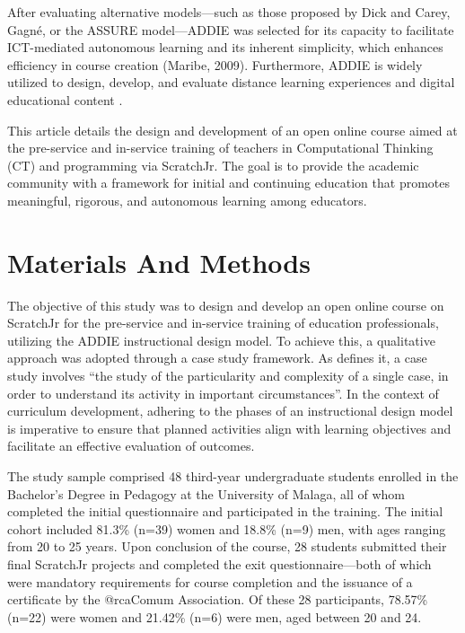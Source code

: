\documentclass[english]{textolivre}
\begin{document}
After evaluating alternative models—such as those proposed by Dick and Carey, Gagné, or the ASSURE model—ADDIE was selected for its capacity to facilitate ICT-mediated autonomous learning and its inherent simplicity, which enhances efficiency in course creation (Maribe, 2009). Furthermore, ADDIE is widely utilized to design, develop, and evaluate distance learning experiences and digital educational content \cite{trust2018using,raposo2020innovacion}.

This article details the design and development of an open online course aimed at the pre-service and in-service training of teachers in Computational Thinking (CT) and programming via ScratchJr. The goal is to provide the academic community with a framework for initial and continuing education that promotes meaningful, rigorous, and autonomous learning among educators.


\section{Materials And Methods}\label{sec-modelo}
The objective of this study was to design and develop an open online course on ScratchJr for the pre-service and in-service training of education professionals, utilizing the ADDIE instructional design model. To achieve this, a qualitative approach was adopted through a case study framework. As \textcite[p. 11]{stake2005investigacion} defines it, a case study involves “the study of the particularity and complexity of a single case, in order to understand its activity in important circumstances”. In the context of curriculum development, adhering to the phases of an instructional design model is imperative to ensure that planned activities align with learning objectives and facilitate an effective evaluation of outcomes.

The study sample comprised 48 third-year undergraduate students enrolled in the Bachelor’s Degree in Pedagogy at the University of Malaga, all of whom completed the initial questionnaire and participated in the training. The initial cohort included 81.3\% (n=39) women and 18.8\% (n=9) men, with ages ranging from 20 to 25 years. Upon conclusion of the course, 28 students submitted their final ScratchJr projects and completed the exit questionnaire—both of which were mandatory requirements for course completion and the issuance of a certificate by the @rcaComum Association. Of these 28 participants, 78.57\% (n=22) were women and 21.42\% (n=6) were men, aged between 20 and 24.
\end{document}
